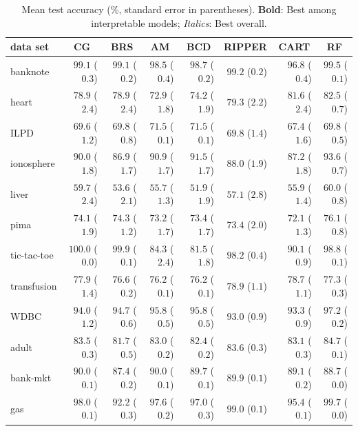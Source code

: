 \documentclass[twoside,11pt]{article}
\begin{document}
\begin{table}
\caption{Mean test accuracy (\%, standard error in parentheses). \textbf{Bold}: Best among interpretable models; \textit{Italics}: Best overall.}
\label{tbl:acc}
\centering
\footnotesize
\begin{tabular}{lrrrrrrr}%
\toprule
data set&\multicolumn{1}{c}{CG}&\multicolumn{1}{c}{BRS}&\multicolumn{1}{c}{AM}&\multicolumn{1}{c}{BCD}&\multicolumn{1}{c}{RIPPER}&\multicolumn{1}{c}{CART}&\multicolumn{1}{c}{RF}\\
\midrule
banknote&$99.1$ ($0.3$)&$99.1$ ($0.2$)&$98.5$ ($0.4$)&$98.7$ ($0.2$)&$\mathbf{99.2}$ ($0.2$)&$96.8$ ($0.4$)&$\mathit{99.5}$ ($0.1$)\\
heart&$78.9$ ($2.4$)&$78.9$ ($2.4$)&$72.9$ ($1.8$)&$74.2$ ($1.9$)&$79.3$ ($2.2$)&$\mathbf{81.6}$ ($2.4$)&$\mathit{82.5}$ ($0.7$)\\
ILPD&$69.6$ ($1.2$)&$69.8$ ($0.8$)&$\bm{\mathit{71.5}}$ ($0.1$)&$\bm{\mathit{71.5}}$ ($0.1$)&$69.8$ ($1.4$)&$67.4$ ($1.6$)&$69.8$ ($0.5$)\\
ionosphere&$90.0$ ($1.8$)&$86.9$ ($1.7$)&$90.9$ ($1.7$)&$\mathbf{91.5}$ ($1.7$)&$88.0$ ($1.9$)&$87.2$ ($1.8$)&$\mathit{93.6}$ ($0.7$)\\
liver&$\mathbf{59.7}$ ($2.4$)&$53.6$ ($2.1$)&$55.7$ ($1.3$)&$51.9$ ($1.9$)&$57.1$ ($2.8$)&$55.9$ ($1.4$)&$\mathit{60.0}$ ($0.8$)\\
pima&$74.1$ ($1.9$)&$\mathbf{74.3}$ ($1.2$)&$73.2$ ($1.7$)&$73.4$ ($1.7$)&$73.4$ ($2.0$)&$72.1$ ($1.3$)&$\mathit{76.1}$ ($0.8$)\\
tic-tac-toe&$\bm{\mathit{100.0}}$ ($0.0$)&$99.9$ ($0.1$)&$84.3$ ($2.4$)&$81.5$ ($1.8$)&$98.2$ ($0.4$)&$90.1$ ($0.9$)&$98.8$ ($0.1$)\\
transfusion&$77.9$ ($1.4$)&$76.6$ ($0.2$)&$76.2$ ($0.1$)&$76.2$ ($0.1$)&$\bm{\mathit{78.9}}$ ($1.1$)&$78.7$ ($1.1$)&$77.3$ ($0.3$)\\
WDBC&$94.0$ ($1.2$)&$94.7$ ($0.6$)&$\bm{95.8}$ ($0.5$)&$\mathbf{95.8}$ ($0.5$)&$93.0$ ($0.9$)&$93.3$ ($0.9$)&$\mathit{97.2}$ ($0.2$)\\
\midrule
adult&$83.5$ ($0.3$)&$81.7$ ($0.5$)&$83.0$ ($0.2$)&$82.4$ ($0.2$)&$\mathbf{83.6}$ ($0.3$)&$83.1$ ($0.3$)&$\mathit{84.7}$ ($0.1$)\\
bank-mkt&$\bm{\mathit{90.0}}$ ($0.1$)&$87.4$ ($0.2$)&$\bm{\mathit{90.0}}$ ($0.1$)&$89.7$ ($0.1$)&$89.9$ ($0.1$)&$89.1$ ($0.2$)&$88.7$ ($0.0$)\\
gas&$98.0$ ($0.1$)&$92.2$ ($0.3$)&$97.6$ ($0.2$)&$97.0$ ($0.3$)&$\mathbf{99.0}$ ($0.1$)&$95.4$ ($0.1$)&$\mathit{99.7}$ ($0.0$)\\

\end{tabular}
\end{table}
\end{document}
